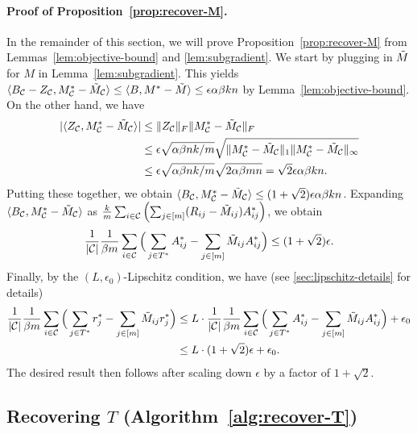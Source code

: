 \paragraph{Proof of Proposition~\ref{prop:recover-M}.}
In the remainder of this section, we will prove Proposition~\ref{prop:recover-M} 
from Lemmas~\ref{lem:objective-bound} and \ref{lem:subgradient}.
We start by plugging in $\tilde{M}$ for $M$ in Lemma~\ref{lem:subgradient}. This yields
$\langle B_{\mathcal{C}} - Z_{\mathcal{C}}, M^*_{\mathcal{C}} - \tilde{M}_{\mathcal{C}} \rangle \leq \langle B, M^* - \tilde{M} \rangle \leq \epsilon \alpha\beta kn$
by Lemma~\ref{lem:objective-bound}.
On the other hand, we have 
\begin{align}
|\langle Z_{\mathcal{C}}, M^*_{\mathcal{C}} - \tilde{M}_{\mathcal{C}} \rangle| &\leq \|Z_{\mathcal{C}}\|_F\|M^*_{\mathcal{C}} - \tilde{M}_{\mathcal{C}}\|_F \\
 &\leq \epsilon\sqrt{\alpha\beta nk/m} \sqrt{\|M^*_{\mathcal{C}} - \tilde{M}_{\mathcal{C}}\|_{1}\|M^*_{\mathcal{C}} - \tilde{M}_{\mathcal{C}}\|_{\infty}} \\
 &\leq \epsilon\sqrt{\alpha\beta nk/m} \sqrt{2\alpha\beta mn} = \sqrt{2}\epsilon\alpha\beta kn.
\end{align}
Putting these together, we obtain
$\langle B_{\mathcal{C}}, M^*_{\mathcal{C}} - \tilde{M}_{\mathcal{C}} \rangle \leq (1+\sqrt{2})\epsilon \alpha\beta kn$.
Expanding $\langle B_{\mathcal{C}}, M^*_{\mathcal{C}} - \tilde{M}_{\mathcal{C}} \rangle$ as 
$\frac{k}{m}\sum_{i \in \mathcal{C}}\left( \sum_{j \in [m]} (R_{ij} - \tilde{M}_{ij})A^*_{ij} \right)$,
we obtain 
\[ \frac{1}{|\mathcal{C}|}\frac{1}{\beta m}\sum_{i \in \mathcal{C}}\Big(\sum_{j \in T^*} A^*_{ij} - \sum_{j \in [m]} \tilde{M}_{ij}A^*_{ij}\Big) \leq (1+\sqrt{2})\epsilon. \]
Finally, by the $(L,\epsilon_0)$-Lipschitz condition, we have (see \ref{sec:lipschitz-details} for details)
\begin{align}
\label{eq:lipschitz-usage}
\frac{1}{|\mathcal{C}|}\frac{1}{\beta m}\sum_{i \in \mathcal{C}}\Big(\sum_{j \in T^*} r^*_j - \sum_{j \in [m]} \tilde{M}_{ij}r^*_j\Big) 
&\leq L \cdot \frac{1}{|\mathcal{C}|}\frac{1}{\beta m}\sum_{i \in \mathcal{C}}\Big(\sum_{j \in T^*} A^*_{ij} - \sum_{j \in [m]} \tilde{M}_{ij}A^*_{ij}\Big) + \epsilon_0 \\
&\leq L \cdot (1+\sqrt{2})\epsilon + \epsilon_0.
\end{align}
The desired result then follows after scaling down $\epsilon$ 
by a factor of $1+\sqrt{2}$.

\subsection{Recovering $T$ (Algorithm~\ref{alg:recover-T})}
\label{sec:approach-T}
\label{sec:rounding}


